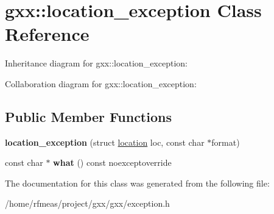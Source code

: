 \hypertarget{classgxx_1_1location__exception}{}\section{gxx\+:\+:location\+\_\+exception Class Reference}
\label{classgxx_1_1location__exception}


Inheritance diagram for gxx\+:\+:location\+\_\+exception\+:


Collaboration diagram for gxx\+:\+:location\+\_\+exception\+:
\subsection*{Public Member Functions}
\begin{DoxyCompactItemize}
\item 
{\bfseries location\+\_\+exception} (struct \hyperlink{structlocation}{location} loc, const char $\ast$format)\hypertarget{classgxx_1_1location__exception_ae5b9b3c317ae28710429520c5ed8b021}{}\label{classgxx_1_1location__exception_ae5b9b3c317ae28710429520c5ed8b021}

\item 
const char $\ast$ {\bfseries what} () const noexceptoverride\hypertarget{classgxx_1_1location__exception_a2fb8a0c0bf24493cd3e466c772b50e10}{}\label{classgxx_1_1location__exception_a2fb8a0c0bf24493cd3e466c772b50e10}

\end{DoxyCompactItemize}


The documentation for this class was generated from the following file\+:\begin{DoxyCompactItemize}
\item 
/home/rfmeas/project/gxx/gxx/exception.\+h\end{DoxyCompactItemize}

